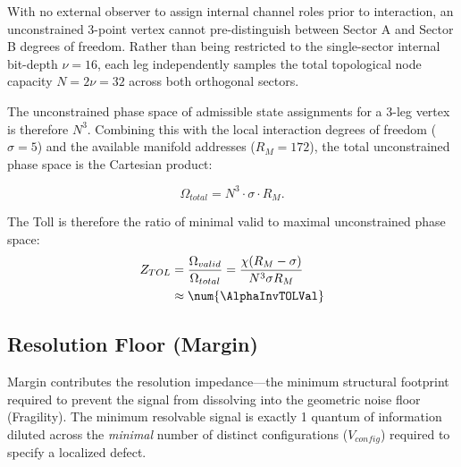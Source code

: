 With no external observer to assign internal channel roles prior to interaction, an unconstrained 3-point vertex cannot pre-distinguish between Sector A and Sector B degrees of freedom. Rather than being restricted to the single-sector internal bit-depth $\nu=16$, each leg independently samples the total topological node capacity $N=2\nu=32$ across both orthogonal sectors.

The unconstrained phase space of admissible state assignments for a 3-leg vertex is therefore $N^3$. Combining this with the local interaction degrees of freedom ($\sigma=5$) and the available manifold addresses ($R_M=172$), the total unconstrained phase space is the Cartesian product:

\begin{equation}
    \Omega_{total} = N^3 \cdot \sigma \cdot R_M.
\end{equation}

The Toll is therefore the ratio of minimal valid to maximal unconstrained phase space:
\begin{equation}
\begin{split}
    Z_{TOL} &= \frac{\Omega_{valid}}{\Omega_{total}} 
    = \frac{\chi(R_M - \sigma)}{N^3 \sigma R_M} \\
    &\approx \num{\AlphaInvTOLVal}
\end{split}
\end{equation}

\subsection{Resolution Floor (Margin)}
\label{subsec:alpha_mar}
Margin contributes the resolution impedance---the minimum structural footprint required to prevent the signal from dissolving into the geometric noise floor (Fragility). The minimum resolvable signal is exactly 1 quantum of information diluted across the \emph{minimal} number of distinct configurations ($V_{config}$) required to specify a localized defect.

